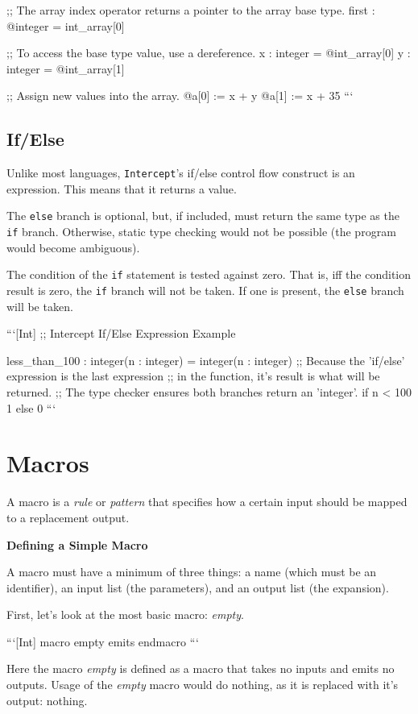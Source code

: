 \documentclass[12pt]{report}
\begin{document}
;; The array index operator returns a pointer to the array base type.
first : @integer = int_array[0]

;; To access the base type value, use a dereference.
x : integer = @int_array[0]
y : integer = @int_array[1]

;; Assign new values into the array.
@a[0] := x + y
@a[1] := x + 35
```

\section{If/Else}
\label{sec:expressions-if_else}

Unlike most languages, \verb|Intercept|'s if/else control flow construct is an expression. This means that it returns a value.

The \verb|else| branch is optional, but, if included, must return the same type as the \verb|if| branch. Otherwise, static type checking would not be possible (the program would become ambiguous).

The condition of the \verb|if| statement is tested against zero. That is, iff the condition result is zero, the \verb|if| branch will not be taken. If one is present, the \verb|else| branch will be taken.

```[Int]
;; Intercept If/Else Expression Example

less_than_100 : integer(n : integer) = integer(n : integer) {
  ;; Because the 'if/else' expression is the last expression
  ;; in the function, it's result is what will be returned.
  ;; The type checker ensures both branches return an 'integer'.
  if n < 100 {
    1
  } else {
    0
  }
}
```

\chapter{Macros}
\label{chpt:macros}

A macro is a \emph{rule} or \emph{pattern} that specifies how a certain input should be mapped to a replacement output.

\textbf{Defining a Simple Macro}

A macro must have a minimum of three things: a name (which must be an identifier), an input list (the parameters), and an output list (the expansion).

First, let's look at the most basic macro: \emph{empty}.

```[Int]
macro empty emits endmacro
```

Here the macro \emph{empty} is defined as a macro that takes no inputs and emits no outputs. Usage of the \emph{empty} macro would do nothing, as it is replaced with it's output: nothing.
\end{document}
